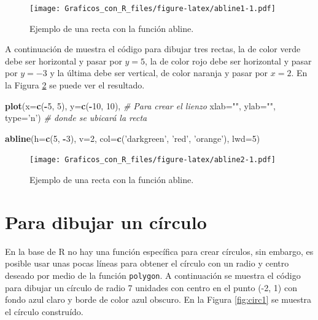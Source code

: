 \documentclass[10pt,]{krantz}
\makeatletter
\newenvironment{Shaded}{\begin{snugshade}}{\end{snugshade}}
\newcommand{\KeywordTok}[1]{\textcolor[rgb]{0.13,0.29,0.53}{\textbf{#1}}}
\newcommand{\DataTypeTok}[1]{\textcolor[rgb]{0.13,0.29,0.53}{#1}}
\newcommand{\DecValTok}[1]{\textcolor[rgb]{0.00,0.00,0.81}{#1}}
\newcommand{\StringTok}[1]{\textcolor[rgb]{0.31,0.60,0.02}{#1}}
\newcommand{\CommentTok}[1]{\textcolor[rgb]{0.56,0.35,0.01}{\textit{#1}}}
\newcommand{\OperatorTok}[1]{\textcolor[rgb]{0.81,0.36,0.00}{\textbf{#1}}}
\newcommand{\NormalTok}[1]{#1}
\let\proglang=\textsf
\newenvironment{kframe}{%
\medskip{}
\setlength{\fboxsep}{.8em}
 \def\at@end@of@kframe{}%
 \ifinner\ifhmode%
  \def\at@end@of@kframe{\end{minipage}}%
  \begin{minipage}{\columnwidth}%
 \fi\fi%
 \def\FrameCommand##1{\hskip\@totalleftmargin \hskip-\fboxsep
 \colorbox{shadecolor}{##1}\hskip-\fboxsep
     \hskip-\linewidth \hskip-\@totalleftmargin \hskip\columnwidth}%
 \MakeFramed {\advance\hsize-\width
   \@totalleftmargin\z@ \linewidth\hsize
   \@setminipage}}%
 {\par\unskip\endMakeFramed%
 \at@end@of@kframe}
\renewenvironment{Shaded}{\begin{kframe}}{\end{kframe}}
\makeatother
\begin{document}
\begin{figure}
\centering
\texttt{[image: Graficos\_con\_R\_files/figure-latex/abline1-1.pdf]}
\caption{\label{fig:abline1}Ejemplo de una recta con la función abline.}
\end{figure}

A continuación de muestra el código para dibujar tres rectas, la de
color verde debe ser horizontal y pasar por \(y=5\), la de color rojo
debe ser horizontal y pasar por \(y=-3\) y la última debe ser vertical,
de color naranja y pasar por \(x=2\). En la Figura \ref{fig:abline2} se
puede ver el resultado.

\begin{Shaded}
\begin{Highlighting}[]
\KeywordTok{plot}\NormalTok{(}\DataTypeTok{x=}\KeywordTok{c}\NormalTok{(}\OperatorTok{-}\DecValTok{5}\NormalTok{, }\DecValTok{5}\NormalTok{), }\DataTypeTok{y=}\KeywordTok{c}\NormalTok{(}\OperatorTok{-}\DecValTok{10}\NormalTok{, }\DecValTok{10}\NormalTok{),    }\CommentTok{# Para crear el lienzo}
     \DataTypeTok{xlab=}\StringTok{""}\NormalTok{, }\DataTypeTok{ylab=}\StringTok{""}\NormalTok{, }\DataTypeTok{type=}\StringTok{'n'}\NormalTok{)  }\CommentTok{# donde se ubicará la recta}

\KeywordTok{abline}\NormalTok{(}\DataTypeTok{h=}\KeywordTok{c}\NormalTok{(}\DecValTok{5}\NormalTok{, }\OperatorTok{-}\DecValTok{3}\NormalTok{), }\DataTypeTok{v=}\DecValTok{2}\NormalTok{,}
       \DataTypeTok{col=}\KeywordTok{c}\NormalTok{(}\StringTok{'darkgreen'}\NormalTok{, }\StringTok{'red'}\NormalTok{, }\StringTok{'orange'}\NormalTok{), }\DataTypeTok{lwd=}\DecValTok{5}\NormalTok{)}
\end{Highlighting}
\end{Shaded}

\begin{figure}
\centering
\texttt{[image: Graficos\_con\_R\_files/figure-latex/abline2-1.pdf]}
\caption{\label{fig:abline2}Ejemplo de una recta con la función abline.}
\end{figure}

\section{\texorpdfstring{Para dibujar un círculo
}{Para dibujar un círculo }}\label{para-dibujar-un-circulo}

En la base de \proglang{R} no hay una función específica para crear
círculos, sin embargo, es posible usar unas pocas líneas para obtener el
círculo con un radio y centro deseado por medio de la función
\texttt{polygon}. A continuación se muestra el código para dibujar un
círculo de radio 7 unidades con centro en el punto (-2, 1) con fondo
azul claro y borde de color azul obscuro. En la Figura \ref{fig:circ1}
se muestra el círculo construído.
\end{document}
